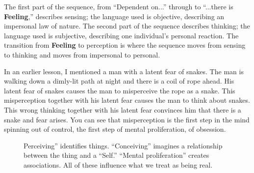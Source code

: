 The first part of the sequence, from “Dependent on...” through to “...there is \textbf{Feeling},” describes sensing; the language used is objective, describing an impersonal law of nature. The second part of the sequence describes thinking; the language used is subjective, describing one individual’s personal reaction. The transition from \textbf{Feeling} to perception is where the sequence moves from sensing to thinking and moves from impersonal to personal.

In an earlier lesson, I mentioned a man with a latent fear of snakes. The man is walking down a dimly-lit path at night and there is a coil of rope ahead. His latent fear of snakes causes the man to misperceive the rope as a snake. This misperception together with his latent fear causes the man to think about snakes. This wrong thinking together with his latent fear convinces him that there is a snake and fear arises. You can see that misperception is the first step in the mind spinning out of control, the first step of mental proliferation, of obsession.

\begin{figure}[H]
\centering

\caption{Perceiving” identifies things. “Conceiving” imagines a relationship between the thing and a “Self.” “Mental proliferation” creates associations. All of these influence what we treat as being real.}
\label{fig:Reality}
\end{figure}

\pagebreak

